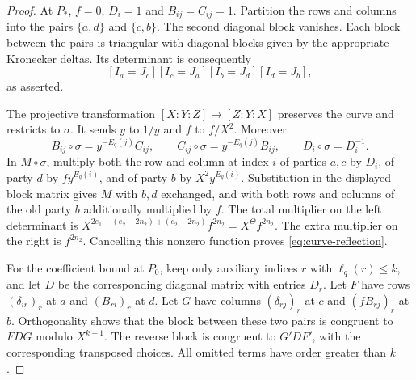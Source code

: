 \begin{proof}
At $P_*$, $f=0$, $D_i=1$ and $B_{ij}=C_{ij}=1$. Partition the rows and columns into the pairs $\{a,d\}$ and $\{c,b\}$. The second diagonal block vanishes. Each block between the pairs is triangular with diagonal blocks given by the appropriate Kronecker deltas. Its determinant is consequently
\[
 [I_a=J_c][I_c=J_a][I_b=J_d][I_d=J_b],
\]
as asserted.

The projective transformation $[X:Y:Z]\mapsto[Z:Y:X]$ preserves the curve and restricts to $\sigma$. It sends $y$ to $1/y$ and $f$ to $f/X^2$. Moreover
\[
 B_{ij}\circ\sigma=y^{-E_q(j)}C_{ij},\qquad
 C_{ij}\circ\sigma=y^{-E_q(j)}B_{ij},\qquad
 D_i\circ\sigma=D_i^{-1}.
\]
In $M\circ\sigma$, multiply both the row and column at index $i$ of parties $a,c$ by $D_i$, of party $d$ by $f y^{E_q(i)}$, and of party $b$ by $X^2y^{E_q(i)}$. Substitution in the displayed block matrix gives $M$ with $b,d$ exchanged, and with both rows and columns of the old party $b$ additionally multiplied by $f$. The total multiplier on the left determinant is
$X^{2e_1+(e_2-2n_2)+(e_2+2n_2)}f^{2n_2}=X^\Theta f^{2n_2}$.
The extra multiplier on the right is $f^{2n_2}$. Cancelling this nonzero function proves \eqref{eq:curve-reflection}.

For the coefficient bound at $P_0$, keep only auxiliary indices $r$ with $\ell_q(r)\leq k$, and let $D$ be the corresponding diagonal matrix with entries $D_r$. Let $F$ have rows $(\delta_{ir})_r$ at $a$ and $(B_{ri})_r$ at $d$. Let $G$ have columns $(\delta_{rj})_r$ at $c$ and $(fB_{rj})_r$ at $b$. Orthogonality shows that the block between these two pairs is congruent to $FDG$ modulo $X^{k+1}$. The reverse block is congruent to $G'DF'$, with the corresponding transposed choices. All omitted terms have order greater than $k$.


\end{proof}

